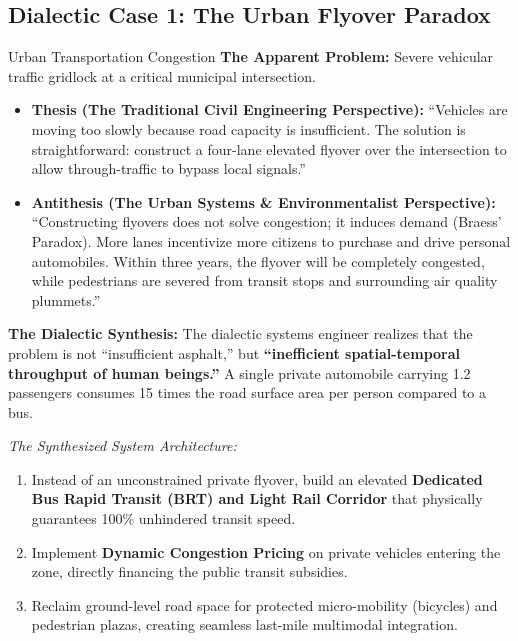 \subsection{Dialectic Case 1: The Urban Flyover Paradox}
\begin{dialecticbox}{Urban Transportation Congestion}
\textbf{The Apparent Problem:} Severe vehicular traffic gridlock at a critical municipal intersection.

\begin{itemize}[leftmargin=1.5em]
    \item \textbf{Thesis (The Traditional Civil Engineering Perspective):}
    ``Vehicles are moving too slowly because road capacity is insufficient. The solution is straightforward: construct a four-lane elevated flyover over the intersection to allow through-traffic to bypass local signals.''
    \item \textbf{Antithesis (The Urban Systems \& Environmentalist Perspective):}
    ``Constructing flyovers does not solve congestion; it induces demand (Braess' Paradox). More lanes incentivize more citizens to purchase and drive personal automobiles. Within three years, the flyover will be completely congested, while pedestrians are severed from transit stops and surrounding air quality plummets.''
\end{itemize}

\textbf{The Dialectic Synthesis:}
The dialectic systems engineer realizes that the problem is not ``insufficient asphalt,'' but \textbf{``inefficient spatial-temporal throughput of human beings.''} A single private automobile carrying 1.2 passengers consumes 15 times the road surface area per person compared to a bus.

\textit{The Synthesized System Architecture:}
\begin{enumerate}[leftmargin=1.5em]
    \item Instead of an unconstrained private flyover, build an elevated \textbf{Dedicated Bus Rapid Transit (BRT) and Light Rail Corridor} that physically guarantees 100\% unhindered transit speed.
    \item Implement \textbf{Dynamic Congestion Pricing} on private vehicles entering the zone, directly financing the public transit subsidies.
    \item Reclaim ground-level road space for protected micro-mobility (bicycles) and pedestrian plazas, creating seamless last-mile multimodal integration.
\end{enumerate}
\end{dialecticbox}

